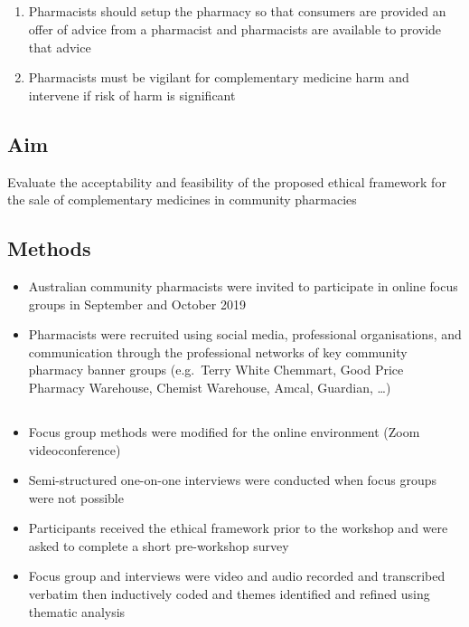 \documentclass[]{article}
\begin{document}
\subsection{}\label{section}

\begin{enumerate}
\def\labelenumi{\arabic{enumi}.}
\setcounter{enumi}{3}
\item
  Pharmacists should setup the pharmacy so that consumers are provided
  an offer of advice from a pharmacist and pharmacists are available to
  provide that advice
\item
  Pharmacists must be vigilant for complementary medicine harm and
  intervene if risk of harm is significant
\end{enumerate}

\subsection{Aim}\label{aim}

Evaluate the acceptability and feasibility of the proposed ethical
framework for the sale of complementary medicines in community
pharmacies

\subsection{Methods}\label{methods}

\begin{itemize}
\item
  Australian community pharmacists were invited to participate in online
  focus groups in September and October 2019
\item
  Pharmacists were recruited using social media, professional
  organisations, and communication through the professional networks of
  key community pharmacy banner groups (e.g.~Terry White Chemmart, Good
  Price Pharmacy Warehouse, Chemist Warehouse, Amcal, Guardian,
  \ldots{})
\end{itemize}

\subsection{}\label{section-1}

\begin{itemize}
\item
  Focus group methods were modified for the online environment (Zoom
  videoconference) \autocites{Basch1987}{Knodel1993}{Gaiser2017}
\item
  Semi-structured one-on-one interviews were conducted when focus groups
  were not possible
\item
  Participants received the ethical framework prior to the workshop and
  were asked to complete a short pre-workshop survey
\item
  Focus group and interviews were video and audio recorded and
  transcribed verbatim then inductively coded and themes identified and
  refined using thematic analysis \autocite{Braun2016}
\end{itemize}
\end{document}

